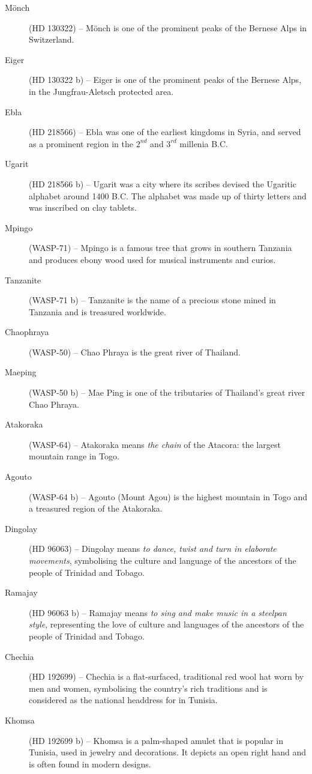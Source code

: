 \begin{description}
\item[Mönch] (HD 130322) -- Mönch is one of the prominent peaks of the Bernese Alps in Switzerland.
\item[Eiger] (HD 130322 b) -- Eiger is one of the prominent peaks of the Bernese Alps, in the Jungfrau-Aletsch protected area.
\item[Ebla] (HD 218566) -- Ebla was one of the earliest kingdoms in Syria, and served as a prominent region in the $2^{nd}$ and $3^{rd}$ millenia B.C.
\item[Ugarit] (HD 218566 b) -- Ugarit was a city where its scribes devised the Ugaritic alphabet around 1400 B.C. The alphabet was made up of thirty letters and was inscribed on clay tablets.
\item[Mpingo] (WASP-71) -- Mpingo is a famous tree that grows in southern Tanzania and produces ebony wood used for musical instruments and curios.
\item[Tanzanite] (WASP-71 b) -- Tanzanite is the name of a precious stone mined in Tanzania and is treasured worldwide.
\item[Chaophraya] (WASP-50) -- Chao Phraya is the great river of Thailand.
\item[Maeping] (WASP-50 b) -- Mae Ping is one of the tributaries of Thailand's great river Chao Phraya.
\item[Atakoraka] (WASP-64) -- Atakoraka means \textit{the chain} of the Atacora: the largest mountain range in Togo.
\item[Agouto] (WASP-64 b) -- Agouto (Mount Agou) is the highest mountain in Togo and a treasured region of the Atakoraka.
\item[Dingolay] (HD 96063) -- Dingolay means \textit{to dance, twist and turn in elaborate movements}, symbolising the culture and language of the ancestors of the people of Trinidad and Tobago.
\item[Ramajay] (HD 96063 b) -- Ramajay means \textit{to sing and make music in a steelpan style}, representing the love of culture and languages of the ancestors of the people of Trinidad and Tobago.
\item[Chechia] (HD 192699) -- Chechia is a flat-surfaced, traditional red wool hat worn by men and women, symbolising the country's rich traditions and is considered as the national headdress for in Tunisia.
\item[Khomsa] (HD 192699 b) -- Khomsa is a palm-shaped amulet that is popular in Tunisia, used in jewelry and decorations. It depicts an open right hand and is often found in modern designs.

\end{description}
